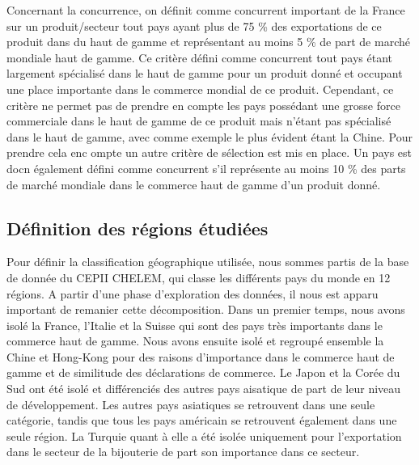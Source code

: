\documentclass[french,10pt,a4paper]{article}
\begin{document}
Concernant la concurrence, on définit comme concurrent important de la France sur un produit/secteur tout pays ayant plus de 75 \% des exportations de ce produit dans du haut de gamme et représentant au moins 5 \% de part de marché mondiale haut de gamme. Ce critère défini comme concurrent tout pays étant largement spécialisé dans le haut de gamme pour un produit donné et occupant une place importante dans le commerce mondial de ce produit. Cependant, ce critère ne permet pas de prendre en compte les pays possédant une grosse force commerciale dans le haut de gamme de ce produit mais n'étant pas spécialisé dans le haut de gamme, avec comme exemple le plus évident étant la Chine. Pour prendre cela enc ompte un autre critère de sélection est mis en place. Un pays est docn également défini comme concurrent s'il représente au moins 10 \% des parts de marché mondiale dans le commerce haut de gamme d'un produit donné. 

\subsection{Définition des régions étudiées}

Pour définir la classification géographique utilisée, nous sommes partis de la base de donnée du CEPII CHELEM, qui classe les différents pays du monde en 12 régions. A partir d'une phase d'exploration des données, il nous est apparu important de remanier cette décomposition. Dans un premier temps, nous avons isolé la France, l'Italie et la Suisse qui sont des pays très importants dans le commerce  haut de gamme. Nous avons ensuite isolé et regroupé ensemble la Chine et Hong-Kong pour des raisons d'importance dans le commerce haut de gamme et de similitude des déclarations de commerce. Le Japon et la Corée du Sud ont été isolé et différenciés des autres pays aisatique de part de leur niveau de développement. Les autres pays asiatiques se retrouvent dans une seule catégorie, tandis que tous les pays américain se retrouvent également dans une seule région. La Turquie quant à elle a été isolée uniquement pour l'exportation dans le secteur de la bijouterie de part son importance dans ce secteur. 





\newpage


\end{document}

